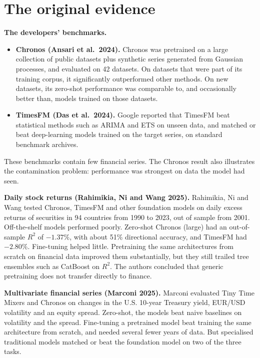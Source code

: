 \section{The original evidence}
\label{sec:21-evidence}

\textbf{The developers' benchmarks.}

\begin{itemize}
  \item \textbf{Chronos (Ansari et al.\ 2024).} Chronos was pretrained on a large collection of public datasets plus synthetic series generated from Gaussian processes, and evaluated on 42 datasets. On datasets that were part of its training corpus, it significantly outperformed other methods. On new datasets, its zero-shot performance was comparable to, and occasionally better than, models trained on those datasets.
  \item \textbf{TimesFM (Das et al.\ 2024).} Google reported that TimesFM beat statistical methods such as ARIMA and ETS on unseen data, and matched or beat deep-learning models trained on the target series, on standard benchmark archives.
\end{itemize}

These benchmarks contain few financial series. The Chronos result also illustrates the contamination problem: performance was strongest on data the model had seen.

\textbf{Daily stock returns (Rahimikia, Ni and Wang 2025).} Rahimikia, Ni and Wang tested Chronos, TimesFM and other foundation models on daily excess returns of securities in 94 countries from 1990 to 2023, out of sample from 2001. Off-the-shelf models performed poorly. Zero-shot Chronos (large) had an out-of-sample $R^2$ of $-1.37\%$, with about 51\% directional accuracy, and TimesFM had $-2.80\%$. Fine-tuning helped little. Pretraining the same architectures from scratch on financial data improved them substantially, but they still trailed tree ensembles such as CatBoost on $R^2$. The authors concluded that generic pretraining does not transfer directly to finance.

\textbf{Multivariate financial series (Marconi 2025).} Marconi evaluated Tiny Time Mixers and Chronos on changes in the U.S. 10-year Treasury yield, EUR/USD volatility and an equity spread. Zero-shot, the models beat naive baselines on volatility and the spread. Fine-tuning a pretrained model beat training the same architecture from scratch, and needed several fewer years of data. But specialised traditional models matched or beat the foundation model on two of the three tasks.

